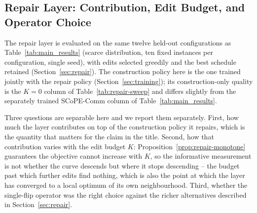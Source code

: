 \subsection{Repair Layer: Contribution, Edit Budget, and Operator Choice}
\label{sec:repair-results}


The repair layer is evaluated on the same twelve held-out configurations as Table~\ref{tab:main_results} (scarce distribution, ten fixed instances per configuration, single seed), with edits selected greedily and the best schedule retained (Section~\ref{sec:repair}). The construction policy here is the one trained jointly with the repair policy (Section~\ref{sec:training}); its construction-only quality is the $K{=}0$ column of Table~\ref{tab:repair-sweep} and differs slightly from the separately trained SCoPE-Comm column of Table~\ref{tab:main_results}.

Three questions are separable here and we report them separately. First, how much the layer contributes on top of the construction policy it repairs, which is the quantity that matters for the claim in the title. Second, how that contribution varies with the edit budget $K$: Proposition~\ref{prop:repair-monotone} guarantees the objective cannot increase with $K$, so the informative measurement is not whether the curve descends but where it stops descending -- the budget past which further edits find nothing, which is also the point at which the layer has converged to a local optimum of its own neighbourhood. Third, whether the single-flip operator was the right choice against the richer alternatives described in Section~\ref{sec:repair}.

